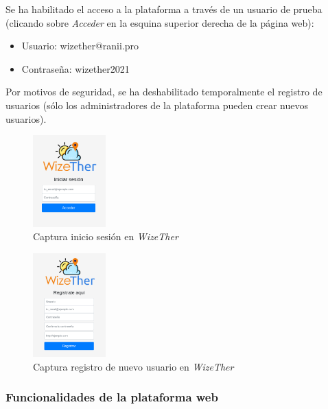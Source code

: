 \documentclass[12pt]{article}
\begin{document}
\noindent Se ha habilitado el acceso a la plataforma a través de un usuario de prueba (clicando sobre \textit{Acceder} en la esquina superior derecha de la página web):

\begin{itemize}
	\item Usuario: wizether@ranii.pro 
	\item Contraseña: wizether2021
\end{itemize}

\noindent Por motivos de seguridad, se ha deshabilitado temporalmente el registro de usuarios (sólo los administradores de la plataforma pueden crear nuevos usuarios).

\begin{figure}[h]
	\begin{center}
		\includegraphics[width=0.25\textwidth]{img_rani/inicar_sesion.png}
		\caption{Captura inicio sesión en \textit{WizeTher}}
	\end{center}
\end{figure}

\begin{figure}[h]
	\begin{center}
		\includegraphics[width=0.25\textwidth]{img_rani/registro.png}
		\caption{Captura registro de nuevo usuario en \textit{WizeTher}}
	\end{center}
\end{figure}

\pagebreak

\subsubsection{Funcionalidades de la plataforma web}
\end{document}
